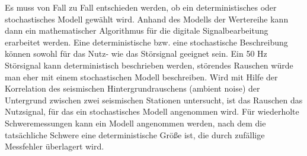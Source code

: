 Es muss von Fall zu Fall entschieden werden, ob ein deterministisches oder stochastisches Modell gewählt wird. Anhand des Modells der Wertereihe kann dann ein mathematischer Algorithmus für die digitale Signalbearbeitung erarbeitet werden. Eine deterministische bzw. eine stochastische Beschreibung können sowohl für das Nutz- wie das Störsignal geeignet sein. Ein 50 Hz Störsignal kann deterministisch beschrieben werden, störendes Rauschen würde man eher mit einem stochastischen Modell beschreiben. Wird mit Hilfe der Korrelation des seismischen Hintergrundrauschens (ambient noise) der Untergrund zwischen zwei seismischen Stationen untersucht, ist das Rauschen das Nutzsignal, für das ein stochastisches Modell angenommen wird. Für wiederholte Schweremessungen kann ein Modell angenommen werden, nach dem die tatsächliche Schwere eine deterministische Größe ist, die durch zufällige Messfehler überlagert wird. 

